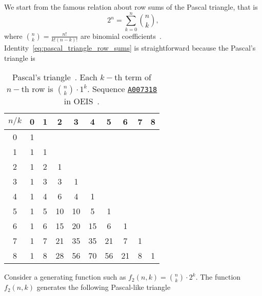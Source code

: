 We start from the famous relation about row sums of the Pascal triangle, that is
\begin{equation}
    2^n = \sum_{k=0}^{n}\binom{n}{k},
    \label{eq:pascal_triangle_row_sums}
\end{equation}
where $\binom{n}{k} = \frac{n!}{k!(n-k)!}$ are binomial coefficients~\cite{graham1989concrete}.
Identity~\eqref{eq:pascal_triangle_row_sums} is straightforward because the Pascal's triangle is
\begin{table}[H]
    \begin{tabular}{c|ccccccccc}
        $n/k$ & 0 & 1 & 2  & 3  & 4  & 5  & 6  & 7 & 8 \\ [3px]
        \hline
        0     & 1 &   &    &    &    &    &    &   &   \\
        1     & 1 & 1 &    &    &    &    &    &   &   \\
        2     & 1 & 2 & 1  &    &    &    &    &   &   \\
        3     & 1 & 3 & 3  & 1  &    &    &    &   &   \\
        4     & 1 & 4 & 6  & 4  & 1  &    &    &   &   \\
        5     & 1 & 5 & 10 & 10 & 5  & 1  &    &   &   \\
        6     & 1 & 6 & 15 & 20 & 15 & 6  & 1  &   &   \\
        7     & 1 & 7 & 21 & 35 & 35 & 21 & 7  & 1 &   \\
        8     & 1 & 8 & 28 & 56 & 70 & 56 & 21 & 8 & 1 \\
    \end{tabular}
    \caption{Pascal's triangle~\cite{conway1996pascal}.
    Each $k-$th term of $n-$th row is $\binom{n}{k}\cdot 1^k$.
    Sequence \href{https://oeis.org/A007318}{\texttt{A007318}} in OEIS~\cite{Sloane_theencyclopedia}.} \label{tab:pascal_triagnle}
\end{table}
Consider a generating function such as $f_2(n,k) = \binom{n}{k}\cdot 2^k$.
The function $f_2(n,k)$ generates the following Pascal-like triangle
